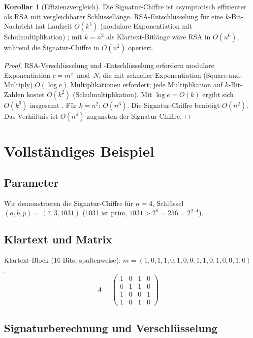 ﻿\documentclass[a4paper,12pt]{scrreprt}
\theoremstyle{definition}
\newtheorem{korollar}{Korollar}[section]
\begin{document}
\begin{korollar}[Effizienzvergleich]
	\label{kor:effizienz}
	Die Signatur-Chiffre ist asymptotisch effizienter als RSA mit vergleichbarer Schlüssellänge. RSA-Entschlüsselung für eine $k$-Bit-Nachricht hat Laufzeit $O(k^3)$ (modulare Exponentiation mit Schulmultiplikation) \cite{Riv78}; mit $k = n^2$ als Klartext-Bitlänge wäre RSA in $O(n^6)$, während die Signatur-Chiffre in $O(n^2)$ operiert.
\end{korollar}

\begin{proof}
	RSA-Verschlüsselung und -Entschlüsselung erfordern modulare Exponentiation $c = m^e \bmod N$, die mit schneller Exponentiation (Square-and-Multiply) $O(\log e)$ Multiplikationen erfordert; jede Multiplikation auf $k$-Bit-Zahlen kostet $O(k^2)$ (Schulmultiplikation). Mit $\log e = O(k)$ ergibt sich $O(k^3)$ insgesamt \cite{MvOV96}. Für $k = n^2$: $O(n^6)$. Die Signatur-Chiffre benötigt $O(n^2)$. Das Verhältnis ist $O(n^4)$ zugunsten der Signatur-Chiffre.
\end{proof}

\section{Vollständiges Beispiel}

\subsection{Parameter}

Wir demonstrieren die Signatur-Chiffre für $n = 4$, Schlüssel $(a, b, p) = (7, 3, 1031)$ (1031 ist prim, $1031 > 2^8 = 256 = 2^{2 \cdot 4}$).

\subsection{Klartext und Matrix}

Klartext-Block (16 Bits, spaltenweise): $m = (1,0,1,1, 0,1,0,0, 1,1,0,1, 0,0,1,0)$.
\[
A = \begin{pmatrix} 1 & 0 & 1 & 0 \\ 0 & 1 & 1 & 0 \\ 1 & 0 & 0 & 1 \\ 1 & 0 & 1 & 0 \end{pmatrix}
\]

\subsection{Signaturberechnung und Verschlüsselung}
\end{document}
